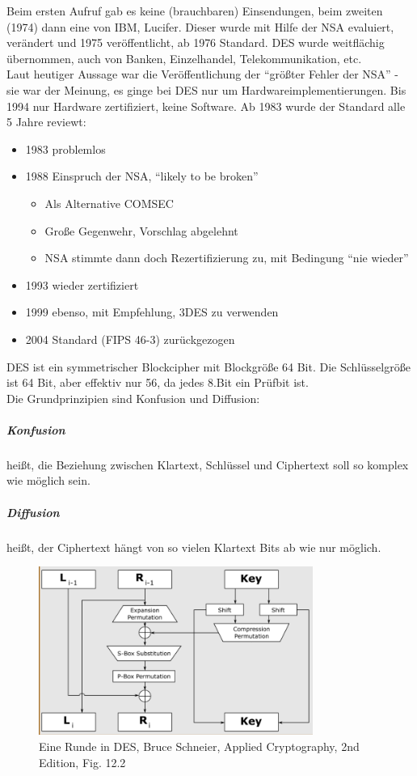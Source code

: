 Beim ersten Aufruf gab es keine (brauchbaren) Einsendungen, beim zweiten (1974) dann eine von IBM, Lucifer. Dieser wurde mit Hilfe der NSA evaluiert, verändert und 
1975 veröffentlicht, ab 1976 Standard. DES wurde weitflächig übernommen, auch von Banken, Einzelhandel, Telekommunikation, etc. \\

Laut heutiger Aussage war die Veröffentlichung der ``größter Fehler der NSA'' - sie war der Meinung, es ginge bei DES nur um Hardwareimplementierungen.
Bis 1994 nur Hardware zertifiziert, keine Software. Ab 1983 wurde der Standard alle 5 Jahre reviewt:

\begin{itemize}
    \item 1983 problemlos
    \item 1988 Einspruch der NSA, ``likely to be broken''
    \begin{itemize}
        \item Als Alternative COMSEC
        \item Große Gegenwehr, Vorschlag abgelehnt
        \item NSA stimmte dann doch Rezertifizierung zu, mit Bedingung ``nie wieder''
    \end{itemize}
    \item 1993 wieder zertifiziert
    \item 1999 ebenso, mit Empfehlung, 3DES zu verwenden
    \item 2004 Standard (FIPS 46-3) zurückgezogen
\end{itemize}

DES ist ein symmetrischer Blockcipher mit Blockgröße 64 Bit. Die Schlüsselgröße ist 64 Bit, aber effektiv nur 56, da jedes 8.Bit ein Prüfbit ist. \\

\noindent Die Grundprinzipien sind Konfusion und Diffusion: 

\subparagraph{Konfusion}  heißt, die Beziehung zwischen Klartext, Schlüssel und Ciphertext 
soll so komplex wie möglich sein.
\subparagraph{Diffusion}  heißt, der Ciphertext hängt von so vielen Klartext Bits ab wie nur möglich. \\

\begin{figure}[h]
    \includegraphics[width=0.8\textwidth]{figures/fig05-des-round.png}
    \centering
    \caption{Eine Runde in DES, Bruce Schneier, Applied Cryptography, 2nd Edition, Fig. 12.2}
    \label{fig:des-round}
\end{figure}

